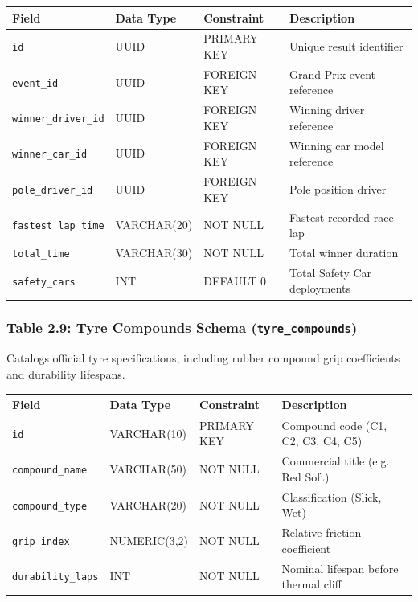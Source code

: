 \documentclass[12pt,a4paper]{report}
\begin{document}
\begin{table}[H]
\centering
\small
\begin{tabularx}{\textwidth}{l p{2.6cm} p{2.6cm} X}
\toprule
\rowcolor{gray!15}
\textbf{Field} & \textbf{Data Type} & \textbf{Constraint} & \textbf{Description} \\
\midrule
\texttt{id} & UUID & PRIMARY KEY & Unique result identifier \\
\texttt{event\_id} & UUID & FOREIGN KEY & Grand Prix event reference \\
\texttt{winner\_driver\_id} & UUID & FOREIGN KEY & Winning driver reference \\
\texttt{winner\_car\_id} & UUID & FOREIGN KEY & Winning car model reference \\
\texttt{pole\_driver\_id} & UUID & FOREIGN KEY & Pole position driver \\
\texttt{fastest\_lap\_time} & VARCHAR(20) & NOT NULL & Fastest recorded race lap \\
\texttt{total\_time} & VARCHAR(30) & NOT NULL & Total winner duration \\
\texttt{safety\_cars} & INT & DEFAULT 0 & Total Safety Car deployments \\
\bottomrule
\end{tabularx}
\end{table}

\vspace{0.3cm}
\subsubsection*{Table 2.9: Tyre Compounds Schema (\textnormal{\texttt{tyre\_compounds}})}
Catalogs official tyre specifications, including rubber compound grip coefficients and durability lifespans.

\begin{table}[H]
\centering
\small
\begin{tabularx}{\textwidth}{l p{2.6cm} p{2.6cm} X}
\toprule
\rowcolor{gray!15}
\textbf{Field} & \textbf{Data Type} & \textbf{Constraint} & \textbf{Description} \\
\midrule
\texttt{id} & VARCHAR(10) & PRIMARY KEY & Compound code (C1, C2, C3, C4, C5) \\
\texttt{compound\_name} & VARCHAR(50) & NOT NULL & Commercial title (e.g. Red Soft) \\
\texttt{compound\_type} & VARCHAR(20) & NOT NULL & Classification (Slick, Wet) \\
\texttt{grip\_index} & NUMERIC(3,2) & NOT NULL & Relative friction coefficient \\
\texttt{durability\_laps} & INT & NOT NULL & Nominal lifespan before thermal cliff \\
\bottomrule
\end{tabularx}
\end{table}
\end{document}
